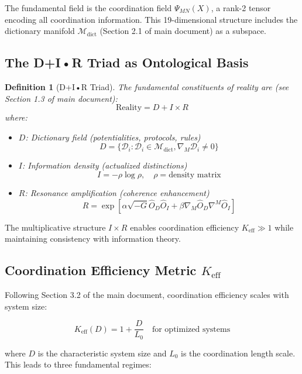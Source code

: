 \documentclass[12pt,a4paper]{article}
\newcommand{\Mdict}{\mathcal{M}_{\text{dict}}}
\newcommand{\Dict}{\mathcal{D}}
\newtheorem{definition}[theorem]{Definition}
\theoremstyle{remark}
\newcommand{\Keff}{K_{\mathrm{eff}}}
\begin{document}
	The fundamental field is the coordination field $\Psi_{MN}(X)$, a rank-2 tensor encoding all coordination information. This 19-dimensional structure includes the dictionary manifold $\Mdict$ (Section 2.1 of main document) as a subspace.
	
	\subsection{The D+I•R Triad as Ontological Basis}
	
	\begin{definition}[D+I•R Triad]
		The fundamental constituents of reality are (see Section 1.3 of main document):
		\[
		\text{Reality} = D + I \times R
		\]
		where:
		\begin{itemize}
			\item $D$: Dictionary field (potentialities, protocols, rules)
			\[
			D = \{\Dict_i : \Dict_i \in \Mdict, \nabla_M \Dict_i \neq 0\}
			\]
			\item $I$: Information density (actualized distinctions)
			\[
			I = -\rho \log \rho, \quad \rho = \text{density matrix}
			\]
			\item $R$: Resonance amplification (coherence enhancement)
			\[
			R = \exp\left[\alpha \sqrt{-G} \hat{O}_D \hat{O}_I + \beta \nabla_M\hat{O}_D \nabla^M\hat{O}_I\right]
			\]
		\end{itemize}
	\end{definition}
	
	The multiplicative structure $I \times R$ enables coordination efficiency $\Keff \gg 1$ while maintaining consistency with information theory.
	
	\subsection[Coordination Efficiency Metric]{Coordination Efficiency Metric $\Keff$}
	
	Following Section 3.2 of the main document, coordination efficiency scales with system size:
	
	\begin{equation}
		\Keff(D) = 1 + \frac{D}{L_0} \quad \text{for optimized systems}
	\end{equation}
	
	where $D$ is the characteristic system size and $L_0$ is the coordination length scale. This leads to three fundamental regimes:
	
\end{document}
